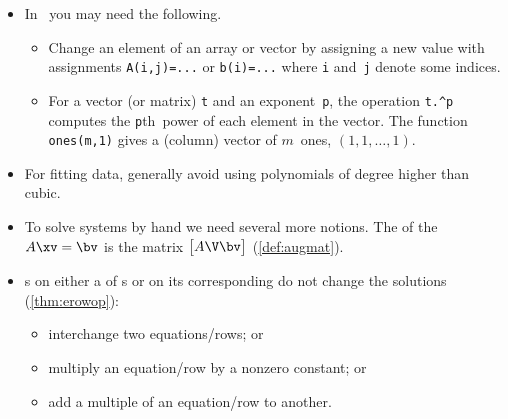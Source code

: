 \begin{itemize}
\itemhi \autoref{pro:unisol} use \script\ to solve the matrix-vector system \(A\xv=\bv\), for a ~\(A\): 
\begin{enumerate}
\item form matrix~\(A\) and ~\(\bv\);
\item check \verb|rcond(A)| exists and is not too small, \(1\geq\text{good} >10^{-2} >\text{poor} >10^{-4} >\text{bad} >10^{-8} >\text{terrible}\);
\item if \verb|rcond(A)| is acceptable, then execute \verb|x=A\b| to compute the solution vector~\(\xv\). 
\end{enumerate}
Checking \verb|rcond()| avoids many mistakes in applications.


\item In \script\ you may need the following.
\begin{itemize}
\itemhi \verb|[ ... ; ... ; ... ]| forms both matrices and vectors, or use newlines instead of the semi-colons.
\itemhi \verb|rcond(A)|  of a ~\(A\) \emph{estimates} the reciprocal of the so-called .
\itemhi \verb|x=A\b| computes an `answer' to \(A\xv=\bv\)\,---but it may not be a solution unless \verb|rcond(A)| exists and is not small;
\item Change an element of an array or vector by assigning a new value with assignments \verb|A(i,j)=...| or \verb|b(i)=...| where \verb|i| and~\verb|j| denote some indices.
\item For a vector (or matrix) \verb|t| and an exponent~\verb|p|, the operation \verb|t.^p| computes the \verb|p|th~power of each element in the vector.
\itemme The function \verb|ones(m,1)| gives a (column) vector of \(m\)~ones, \((1,1,\ldots,1)\).
\end{itemize}

\item For fitting data, generally avoid using polynomials of degree higher than cubic.


\item To solve systems by hand we need several more notions.
The  of the  \(A\xv=\bv\) is the matrix \(\begin{bmatrix} A\V \bv \end{bmatrix}\)  (\autoref{def:augmat}).

\item {}s on either a  of s or on its corresponding  do not change the solutions (\autoref{thm:erowop}):
\begin{itemize}
\item interchange two equations\slash rows; or
\item multiply an equation\slash row by a nonzero constant; or
\item add a multiple of an equation\slash row to another.
\end{itemize}


\end{itemize}
